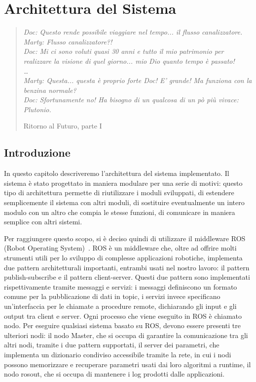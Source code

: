 \chapter{Architettura del Sistema}
\label{cap:architettura}
\thispagestyle{empty}

\begin{quotation}
{\footnotesize
\noindent \emph{Doc: Questo rende possibile viaggiare nel tempo... il flusso canalizzatore.
Marty: Flusso canalizzatore?! \\
Doc: Mi ci sono voluti quasi 30 anni e tutto il mio patrimonio per realizzare la visione di quel giorno... mio Dio quanto tempo è passato! \\
\dots \\
Marty: Questa... questa è proprio forte Doc! E' grande! Ma funziona con la benzina normale? \\
Doc: Sfortunamente no! Ha bisogno di un qualcosa di un pò più vivace: Plutonio.
}
\begin{flushright}
Ritorno al Futuro, parte I
\end{flushright}
}
\end{quotation}
\vspace{0.5cm}

\section{Introduzione}

In questo capitolo descriveremo l'architettura del sistema implementato. Il sistema è stato progettato in maniera modulare per una serie di motivi: questo tipo di architettura permette di riutilizzare i moduli sviluppati, di estendere semplicemente il sistema con altri moduli, di sostituire eventualmente un intero modulo con un altro che compia le stesse funzioni, di comunicare in maniera semplice con altri sistemi. 

Per raggiungere questo scopo, si è deciso quindi di utilizzare il middleware ROS (Robot Operating System)~\cite{quigley2009ros}.
ROS è un middleware che, oltre ad offrire molti strumenti utili per lo sviluppo di complesse applicazioni robotiche, implementa due pattern architetturali importanti, entrambi usati nel nostro lavoro: il pattern publish-subscribe e il pattern client-server.
Questi due pattern sono implementati rispettivamente tramite messaggi e servizi: i messaggi definiscono un formato comune per la pubblicazione di dati in topic, i servizi invece specificano un'interfaccia per le chiamate a procedure remote, dichiarando gli input e gli output tra client e server.
Ogni processo che viene eseguito in ROS è chiamato nodo. Per eseguire qualsiasi sistema basato su ROS, devono essere presenti tre ulteriori nodi: il nodo Master, che si occupa di garantire la comunicazione tra gli altri nodi, tramite i due pattern supportati, il server dei parametri, che implementa un dizionario condiviso accessibile tramite la rete, in cui i nodi possono memorizzare e recuperare parametri usati dai loro algoritmi a runtime, il nodo rosout, che si occupa di mantenere i log prodotti dalle applicazioni.

